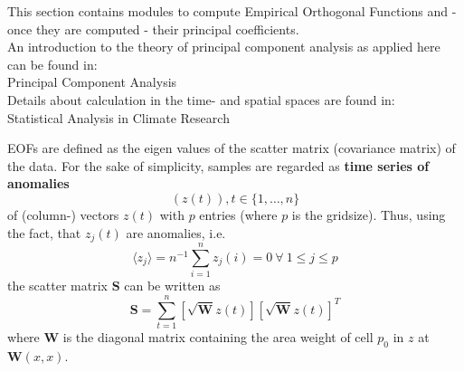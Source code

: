 This section contains modules to compute Empirical Orthogonal Functions and 
- once they are computed - their principal coefficients. \\
An introduction to the theory of principal component analysis as applied here can be found in:\\ 
\hspace*{1cm} Principal Component Analysis \cite{Peisendorfer} \\
Details about calculation in the time- and spatial spaces are found in:\\
\hspace*{1cm} Statistical Analysis in Climate Research \cite{vonStorch}

EOFs are defined as the eigen values of the scatter matrix (covariance matrix) of
the data. For the sake of simplicity, samples are regarded as {\bf time series of anomalies}
\begin{displaymath}
\left(z(t)\right), t\in\{1,\ldots,n\}
\end{displaymath}
of (column-) vectors \(z(t)\) with \(p\) entries (where \(p\) is the gridsize). 
Thus, using the fact, that \(z_j(t)\) are anomalies, i.e.
\begin{displaymath}
\langle z_j\rangle=n^{-1}\sum_{i=1}^{n}z_j(i)=0~\forall~1\le j \le p
\end{displaymath} the scatter matrix \(\mathbf{S}\) can be written as
\begin{displaymath}
\mathbf{S} = \sum_{t=1}^{n} \left[\sqrt{\mathbf{W}}z(t)\right]\left[\sqrt{\mathbf{W}}z(t)\right]^T
\end{displaymath}
where \(\mathbf{W}\) is the diagonal matrix containing the area weight of cell \(p_0\) 
in \(z\) at \(\mathbf{W}(x,x)\).

